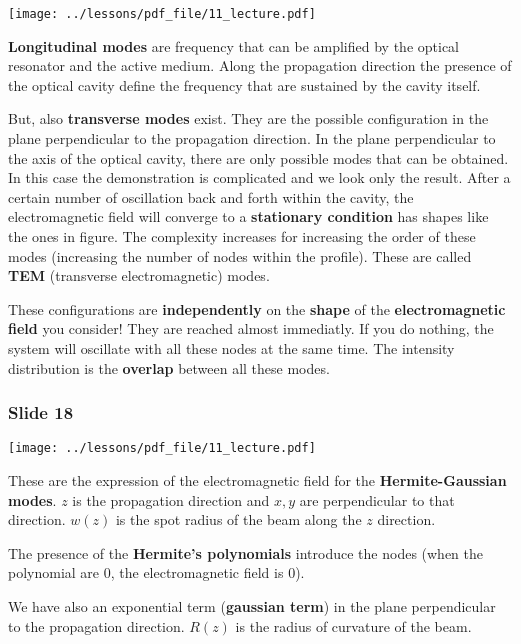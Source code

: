 \documentclass[../main/main.tex]{subfiles}
\begin{document}
\begin{minipage}[]{0.5\linewidth}
\centering
\texttt{[image: ../lessons/pdf\_file/11\_lecture.pdf]}
\end{minipage}
\hspace{0.3cm}\vspace{0.3cm}
\begin{minipage}[c]{0.47\linewidth}

\textbf{Longitudinal modes} are frequency that can be amplified by the optical resonator and the active medium. Along the propagation direction the presence of the optical cavity define the frequency that are sustained by the cavity itself.

But, also \textbf{transverse modes} exist. They are the possible configuration in the plane perpendicular to the propagation direction. In the plane perpendicular to the axis of the optical cavity, there are only possible modes that can be obtained. In this case the demonstration is complicated and we look only the result.
After a certain number of oscillation back and forth within the cavity, the electromagnetic field will converge to a \textbf{stationary condition} has shapes like the ones in figure. The complexity increases for increasing the order of these modes (increasing the number of nodes within the profile). These are called \textbf{TEM} (transverse electromagnetic) modes.

\end{minipage}

These configurations are \textbf{independently} on the \textbf{shape} of the \textbf{electromagnetic field} you consider! They are reached almost immediatly. If you do nothing, the system will oscillate with all these nodes at the same time. The intensity distribution is the \textbf{overlap} between all these modes.

\subsubsection*{Slide 18}

\begin{minipage}[]{0.5\linewidth}
\centering
\texttt{[image: ../lessons/pdf\_file/11\_lecture.pdf]}
\end{minipage}
\hspace{0.3cm}\vspace{0.3cm}
\begin{minipage}[c]{0.47\linewidth}

These are the expression of the electromagnetic field for the \textbf{Hermite-Gaussian modes}. \( z \) is the propagation direction and \( x,y \) are perpendicular to that direction. \( w(z) \) is the spot radius of the beam along the \( z \) direction.

The presence of the \textbf{Hermite's polynomials} introduce the nodes (when the polynomial are 0, the electromagnetic field is 0).

We have also an exponential term (\textbf{gaussian term}) in the plane perpendicular to the propagation direction. \( R(z) \) is the radius of curvature of the beam.

\end{minipage}
\end{document}
